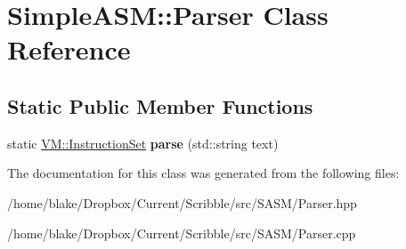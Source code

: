 \hypertarget{class_simple_a_s_m_1_1_parser}{\section{Simple\-A\-S\-M\-:\-:Parser Class Reference}
\label{class_simple_a_s_m_1_1_parser}
}
\subsection*{Static Public Member Functions}
\begin{DoxyCompactItemize}
\item 
\hypertarget{class_simple_a_s_m_1_1_parser_abb5d4c3b5a22575a8fa50999b644728f}{static \hyperlink{class_v_m_1_1_instruction_set}{V\-M\-::\-Instruction\-Set} {\bfseries parse} (std\-::string text)}\label{class_simple_a_s_m_1_1_parser_abb5d4c3b5a22575a8fa50999b644728f}

\end{DoxyCompactItemize}


The documentation for this class was generated from the following files\-:\begin{DoxyCompactItemize}
\item 
/home/blake/\-Dropbox/\-Current/\-Scribble/src/\-S\-A\-S\-M/Parser.\-hpp\item 
/home/blake/\-Dropbox/\-Current/\-Scribble/src/\-S\-A\-S\-M/Parser.\-cpp\end{DoxyCompactItemize}
